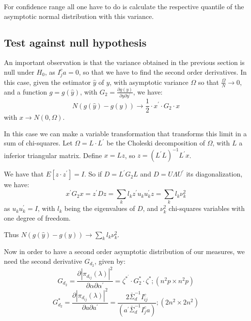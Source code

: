 \documentclass[a4paper,10pt]{article}
\begin{document}
For confidence range all one have to do is calculate the respective quantile of the asymptotic normal distribution with this variance.

\subsection{Test against null hypothesis}

An important observation is that the variance obtained in the previous section is null under $H_0$, as $I_{j}^{c} a = 0$, so that we have to find the second order derivatives. In this case, given the estimator $\hat{y}$ of $y$, with asymptotic variance $\Omega$ so that $\frac{\Omega}{N} \to 0$, and a function $g = g(\hat{y})$, with $G_2 = \frac{\partial g(y)}{\partial y \partial y^{'}}$, we have:
\begin{equation}
N (g(\hat{y}) - g(y)) \to \frac{1}{2} \cdot x^{'} \cdot G_2 \cdot x
\end{equation}
with $x \to N(0, \Omega)$.

In this case we can make a variable transformation that transforms this limit in a sum of chi-squares. Let $\Omega = L \cdot L^{'}$ be the Choleski decomposition of $\Omega$, with $L$ a inferior triangular matrix. Define $x = Lz$, so $z = (L^{'}L)^{-1} L^{'} x$.

We have that $E[z \cdot z^{'}] = I$. So if $D = L^{'} G_2 L$ and $D = U \Lambda U^{'}$ its diagonalization, we have:
\begin{equation}
x^{'} G_{2} x = z^{'} D z = \sum_{k} {l_{k} z^{'} u_{k} u_{k}^{'} z} = \sum_{k} {l_{k} \nu_{k}^{2}}
\end{equation}
as $u_{k} u_{k}^{'} = I$, with $l_{k}$ being the eigenvalues of $D$, and $\nu_{k}^{2}$ chi-squares variables with one degree of freedom.

Thus $N (g(\hat{y}) - g(y)) \to \sum_{k} {l_{k} \nu_{k}^{2}}$.

Now in order to have a second order asymptotic distribution of our measures, we need the second derivative $G_{d_2}$, given by:
\begin{equation}
G_{d_2} = \frac{\partial |\pi_{d_{ij}}(\lambda)|^{2}}{\partial \alpha \partial \alpha^{'}} = \zeta^{\ast^{'}} \cdot G_{2}^{\ast} \cdot \zeta^{\ast}; (n^{2}p \times n^{2}p)
\end{equation}
\begin{equation}
G_{d_2}^{\ast} = \frac{\partial |\pi_{d_{ij}}(\lambda)|^{2}}{\partial a \partial a^{'}} = \frac{2 \bar{\Sigma}_{d}^{-1} I_{ij}^{c}}{(a^{'} \bar{\Sigma}_{d}^{-1} I_{j}^{c} a)}; (2n^{2} \times 2n^{2})
\end{equation}
\end{document}

